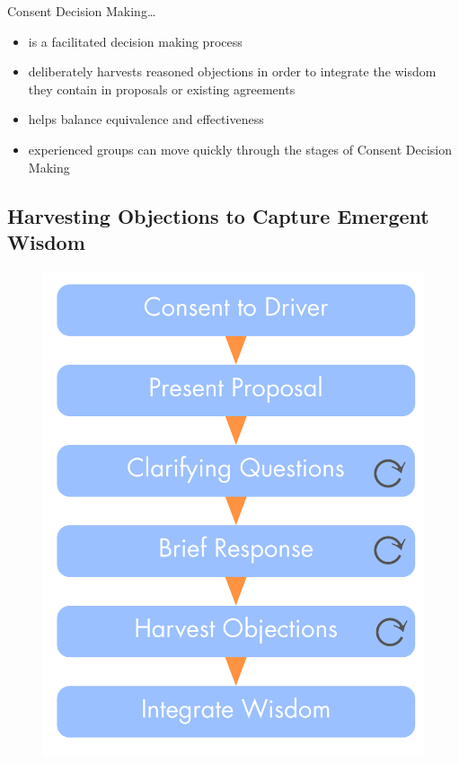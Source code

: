 Consent Decision Making{\ldots}

\begin{itemize}
\item is a facilitated decision making process

\item deliberately harvests reasoned objections in order to integrate the wisdom they contain in proposals or existing agreements

\item helps balance equivalence and effectiveness

\item experienced groups can move quickly through the stages of Consent Decision Making

\end{itemize}

\subsection{Harvesting Objections to Capture Emergent Wisdom}
\label{harvestingobjectionstocaptureemergentwisdom}

\begin{figure}[htbp]
\centering
\includegraphics[keepaspectratio,width=\textwidth,height=0.75\textheight]{img/agreements/cdm-condensed.png}
\end{figure}

